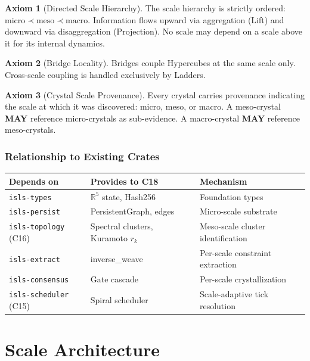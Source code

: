\documentclass[11pt,a4paper,twoside]{article}
\theoremstyle{definition}
\newtheorem{axiom}{Axiom}[section]
\theoremstyle{plain}
\theoremstyle{remark}
\newcommand{\RR}{\mathbb{R}}
\begin{document}
\begin{axiom}[Directed Scale Hierarchy]\label{ax:directed}
The scale hierarchy is strictly ordered: $\text{micro} \prec
\text{meso} \prec \text{macro}$. Information flows upward via
aggregation (Lift) and downward via disaggregation (Projection).
No scale may depend on a scale above it for its internal dynamics.
\end{axiom}

\begin{axiom}[Bridge Locality]\label{ax:bridgelocal}
Bridges couple Hypercubes at the same scale only. Cross-scale coupling
is handled exclusively by Ladders.
\end{axiom}

\begin{axiom}[Crystal Scale Provenance]\label{ax:crystalprov}
Every crystal carries provenance indicating the scale at which it was
discovered: micro, meso, or macro. A meso-crystal \textbf{MAY}
reference micro-crystals as sub-evidence. A macro-crystal \textbf{MAY}
reference meso-crystals.
\end{axiom}


\section{Relationship to Existing Crates}\label{sec:relationship}

\begin{tabularx}{\textwidth}{l l X}
\toprule
\textbf{Depends on} & \textbf{Provides to C18} & \textbf{Mechanism} \\
\midrule
\texttt{isls-types} & $\RR^5$ state, Hash256 & Foundation types \\
\texttt{isls-persist} & PersistentGraph, edges & Micro-scale substrate \\
\texttt{isls-topology} (C16) & Spectral clusters, Kuramoto $r_k$ &
  Meso-scale cluster identification \\
\texttt{isls-extract} & inverse\_weave & Per-scale constraint
  extraction \\
\texttt{isls-consensus} & Gate cascade & Per-scale crystallization \\
\texttt{isls-scheduler} (C15) & Spiral scheduler & Scale-adaptive
  tick resolution \\
\bottomrule
\end{tabularx}


\part{Scale Architecture}\label{part:scale}
\end{document}
